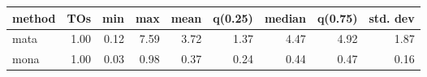 \begin{tabular}{lrrrrrrrr}
\hline
 method   &   TOs &   min &   max &   mean &   q(0.25) &   median &   q(0.75) &   std. dev \\
\hline
 mata     &  1.00 &  0.12 &  7.59 &   3.72 &      1.37 &     4.47 &      4.92 &       1.87 \\
 mona     &  1.00 &  0.03 &  0.98 &   0.37 &      0.24 &     0.44 &      0.47 &       0.16 \\
\hline
\end{tabular}
